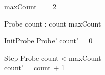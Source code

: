 \documentclass{article}
\begin{document}
\begin{zed}
  maxCount == 2
\end{zed}

\begin{schema}{Probe}
  count : \nat
\where
  count \leq maxCount
\end{schema}

\begin{schema}{InitProbe}
  Probe'
\where
  count' = 0
\end{schema}

\begin{schema}{Step}
  \Delta Probe
\where
  count < maxCount \\
  count' = count + 1
\end{schema}
\end{document}
